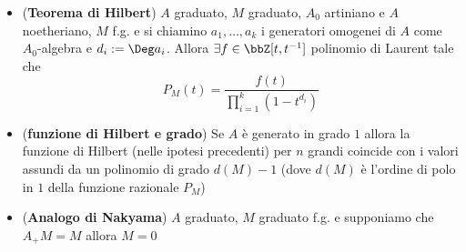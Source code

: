\documentclass[a4paper,NoNotes,GeneralMath]{stdmdoc}
\begin{document}
\begin{itemize}
\item ({\bf Teorema di Hilbert}) $A$ graduato, $M$ graduato, $A_0$
  artiniano e $A$ noetheriano, $M$ f.g. e si chiamino $a_1, \ldots, a_k$
  i generatori omogenei di $A$ come $A_0$-algebra e $d_i := \Deg
  a_i$. Allora $\exists f \in \bbZ[t, t^{-1}]$ polinomio di Laurent tale
  che
  $$P_M(t) = \frac{f(t)}{\prod_{i=1}^k (1 - t^{d_i})}$$
\item ({\bf funzione di Hilbert e grado}) Se $A$ è generato in grado $1$
  allora la funzione di Hilbert (nelle ipotesi precedenti) per $n$
  grandi coincide con i valori assundi da un polinomio di grado $d(M) -
  1$ (dove $d(M)$ è l'ordine di polo in $1$ della funzione razionale
  $P_M$)
\item ({\bf Analogo di Nakyama}) $A$ graduato, $M$ graduato f.g. e
  supponiamo che $A_+ M = M$ allora $M = 0$

\end{itemize}
\end{document}
